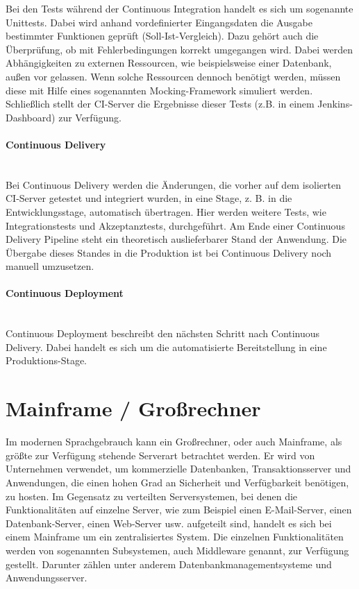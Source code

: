 Bei den Tests während der Continuous Integration handelt es sich um sogenannte \glqq Unittests\grqq.
Dabei wird anhand vordefinierter Eingangsdaten die Ausgabe bestimmter Funktionen geprüft (Soll-Ist-Vergleich).
Dazu gehört auch die Überprüfung, ob mit Fehlerbedingungen korrekt umgegangen wird.
Dabei werden Abhängigkeiten zu externen Ressourcen, wie beispielsweise einer Datenbank, außen vor gelassen.
Wenn solche Ressourcen dennoch benötigt werden, müssen diese mit Hilfe eines sogenannten \glqq Mocking-Framework\grqq{} simuliert werden.
Schließlich stellt der CI-Server die Ergebnisse dieser Tests (z.B. in einem Jenkins-Dashboard) zur Verfügung. 
\cite[Kap. 2]{Laster.2017}

\paragraph{\glqq Continuous Delivery\grqq}~\\
Bei Continuous Delivery werden die Änderungen, die vorher auf dem isolierten CI-Server getestet und integriert wurden, in eine Stage, z. B. in die Entwicklungsstage, automatisch übertragen.
Hier werden weitere Tests, wie Integrationstests und Akzeptanztests, durchgeführt.
Am Ende einer Continuous Delivery Pipeline steht ein theoretisch auslieferbarer Stand der Anwendung.
Die Übergabe dieses Standes in die Produktion ist bei Continuous Delivery noch manuell umzusetzen.
\cite[Kap. 3]{Laster.2017}

\paragraph{\glqq Continuous Deployment\grqq}~\\
Continuous Deployment beschreibt den nächsten Schritt nach Continuous Delivery.
Dabei handelt es sich um die automatisierte Bereitstellung in eine Produktions-Stage.
\cite[Kap. 4]{Laster.2017}

\section{Mainframe / Großrechner}\label{sec:mainframe}
Im modernen Sprachgebrauch kann ein Großrechner, oder auch Mainframe, als größte zur Verfügung stehende Serverart betrachtet werden.
Er wird von Unternehmen verwendet, um  kommerzielle Datenbanken, Transaktionsserver und Anwendungen, die einen hohen Grad an Sicherheit und Verfügbarkeit benötigen, zu hosten.
Im Gegensatz zu verteilten Serversystemen, bei denen die Funktionalitäten auf einzelne Server, wie zum Beispiel einen E-Mail-Server, einen Datenbank-Server, einen Web-Server usw. aufgeteilt sind, handelt es sich bei einem Mainframe um ein zentralisiertes System.
Die einzelnen Funktionalitäten werden von sogenannten \glqq Subsystemen\grqq, auch \glqq Middleware\grqq{} genannt, zur Verfügung gestellt. 
Darunter zählen unter anderem Datenbankmanagementsysteme und Anwendungsserver.
\cite[S. 9-10]{Ebbers.2011}

